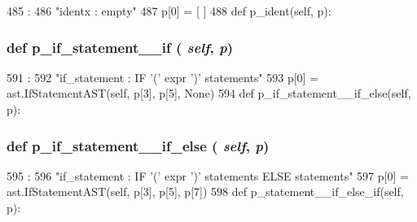\begin{DoxyVerb}
\begin{DoxyCode}
485                                  :
486         "identx : empty"
487         p[0] = [ ]
488 
    def p_ident(self, p):
\end{DoxyCode}
\hypertarget{classslicc_1_1parser_1_1SLICC_ac1f5450666ded9c4ac432e45daf7b9ef}{
\subsubsection[{p\_\-if\_\-statement\_\-\_\-if}]{\setlength{\rightskip}{0pt plus 5cm}def p\_\-if\_\-statement\_\-\_\-if ( {\em self}, \/   {\em p})}}
\label{classslicc_1_1parser_1_1SLICC_ac1f5450666ded9c4ac432e45daf7b9ef}



\begin{DoxyCode}
591                                    :
592         "if_statement : IF '(' expr ')' statements"
593         p[0] = ast.IfStatementAST(self, p[3], p[5], None)
594 
    def p_if_statement__if_else(self, p):
\end{DoxyCode}
\hypertarget{classslicc_1_1parser_1_1SLICC_aadbf6d6104de9ce2070a4a62693b16b3}{
\subsubsection[{p\_\-if\_\-statement\_\-\_\-if\_\-else}]{\setlength{\rightskip}{0pt plus 5cm}def p\_\-if\_\-statement\_\-\_\-if\_\-else ( {\em self}, \/   {\em p})}}
\label{classslicc_1_1parser_1_1SLICC_aadbf6d6104de9ce2070a4a62693b16b3}



\begin{DoxyCode}
595                                         :
596         "if_statement : IF '(' expr ')' statements ELSE statements"
597         p[0] = ast.IfStatementAST(self, p[3], p[5], p[7])
598 
    def p_statement__if_else_if(self, p):
\end{DoxyCode}
\hypertarget{classslicc_1_1parser_1_1SLICC_ab0a9703c95e703c1e2664fd532e19951}{
}
\end{DoxyVerb}
